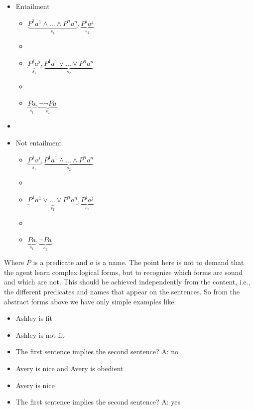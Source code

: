 \begin{itemize}
\item Entailment
\begin{itemize}
\item $\underbrace{P^{1}a^1 \land \dots \land P^{n}a^n}_{s_1}, \underbrace{P^{j}a^j}_{s_2}$ 
\item[]
\item $\underbrace{P^{j}a^j}_{s_1}, \underbrace{P^{1}a^1 \lor \dots \lor P^{n}a^n}_{s_2}$
\item[]
\item $\underbrace{Pa}_{s_1}, \underbrace{\lnot \lnot Pa}_{s_2}$
\end{itemize}
\item[]

\item Not entailment
\begin{itemize}
\item $\underbrace{P^{j}a^j}_{s_1}, \underbrace{P^{1}a^1 \land \dots \land P^{n}a^n}_{s_2}$
\item[]
\item $\underbrace{P^{1}a^1 \lor \dots \lor P^{n}a^n}_{s_1}, \underbrace{P^{j}a^j}_{s_2}$
\item[]
\item $\underbrace{Pa}_{s_1}, \underbrace{\lnot Pa}_{s_2}$
\end{itemize}
\end{itemize}

Where $P$ is a predicate and $a$ is a name. The point here is not to demand that the agent learn complex logical forms, but to recognize which forms are sound and which are not. This should be achieved independently from the content, i.e., the different predicates and names that appear on the sentences. So from the abstract forms above we have only simple examples like:

\begin{itemize} 
\item[] Ashley is fit
\item[] Ashley is not fit
\item[] The first sentence implies the second sentence? A: no
\end{itemize}

\vspace{0.3cm}


\begin{itemize} 
\item[]Avery is nice and Avery is obedient
\item[]Avery is nice
\item[]The first sentence implies the second sentence? A: yes
\end{itemize}

